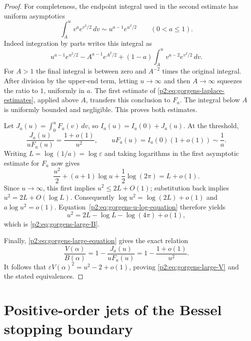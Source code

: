 \documentclass[11pt,a4paper]{article}
\theoremstyle{definition}
\theoremstyle{remark}
\numberwithin{equation}{section}
\begin{document}
\begin{proof}
For completeness, the endpoint integral used in the second estimate
has uniform asymptotics
\[
 \int_A^u v^a e^{v^2/2}\,dv
       \sim u^{a-1}e^{u^2/2}\qquad(0<a\leq1).
\]
Indeed integration by parts writes this integral as
\[
 u^{a-1}e^{u^2/2}-A^{a-1}e^{A^2/2}
       +(1-a)\int_A^u v^{a-2}e^{v^2/2}\,dv.
\]
For $A>1$ the final integral is between zero and $A^{-2}$ times
the original integral. After division by the upper-end term,
letting $u\to\infty$ and then $A\to\infty$ squeezes the ratio to
$1$, uniformly in $a$. The first estimate of
\eqref{p2:eq:gorgens-laplace-estimates}, applied above $A$, transfers
this conclusion to $F_a$. The integral below $A$ is uniformly
bounded and negligible. This proves both estimates.

Let $J_a(u)=\int_0^uF_a(v)\,dv$, so
$I_a(u)=I_a(0)+J_a(u)$. At the threshold,
\[
 \frac{J_a(u)}{uF_a(u)}=\frac{1+o(1)}{u^2},
 \qquad uF_a(u)=I_a(0)(1+o(1))\sim\frac1a.
\]
Writing $L=\log(1/a)=\log\varepsilon$ and taking logarithms in
the first asymptotic estimate for $F_a$ now gives
\begin{equation}\label{p2:eq:gorgens-u-log-equation}
 \frac{u^2}{2}+(a+1)\log u+\frac12\log(2\pi)=L+o(1).
\end{equation}
Since $u\to\infty$, this first implies $u^2\leq2L+O(1)$;
substitution back implies $u^2=2L+O(\log L)$. Consequently
$\log u^2=\log(2L)+o(1)$ and $a\log u^2=o(1)$.
Equation~\eqref{p2:eq:gorgens-u-log-equation} therefore yields
\[
 u^2=2L-\log L-\log(4\pi)+o(1),
\]
which is \eqref{p2:eq:gorgens-large-B}.

Finally, \eqref{p2:eq:gorgens-large-equation} gives the exact relation
\[
 \frac{V(\alpha)}{B(\alpha)}
 =1-\frac{J_a(u)}{uF_a(u)}
 =1-\frac{1+o(1)}{u^2}.
\]
It follows that $\varepsilon V(\alpha)^2=u^2-2+o(1)$, proving
\eqref{p2:eq:gorgens-large-V} and the stated equivalences.
\end{proof}

\section{Positive-order jets of the Bessel stopping boundary}
\label{p2:sec:boundary-jets-round2}
\end{document}
